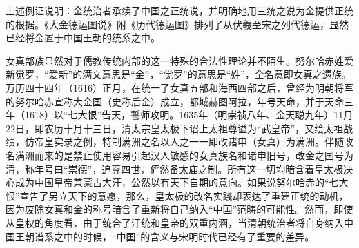 \documentclass[a4paper, 12pt, openright]{ctexbook}
\begin{document}
上述例证说明：金统治者承续了中国之正统说，并明确地用三统之说为金提供正统的根据。《大金德运图说》附《历代德运图》排列了从伏羲至宋之列代德运，显然已经将金置于中国王朝的统系之中。

女真部族显然对于儒教传统内部的这一特殊的合法性理论并不陌生。努尔哈赤姓爱新觉罗，“爱新”的满文意思是“金”，“觉罗”的意思是“姓”，全名意即女真之遗族。万历四十四年（1616）正月，在统一了女真五部和海西四部之后，曾经为明朝将军的努尔哈赤宣称大金国（史称后金）成立，都城赫图阿拉，年号天命，并于天命三年（1618）以“七大恨”告天，誓师攻明。1635年（明崇祯八年、金天聪九年）11月22日，即农历十月十三日，清太宗皇太极下诏上太祖尊谥为“武皇帝”，又绘太祖战绩，仿帝皇实录之例，特制满洲之名以人之一一即改诸申（女真）为满洲。伴随改名满洲而来的是禁止使用容易引起汉人敏感的女真族名和诸申旧号，改金之国号为清，称年号曰“崇德”，追尊四世，俨然备太庙之制。所有这一切均暗含着皇太极决心成为中国皇帝兼蒙古大汗，公然以有天下自期的意向。如果说努尔哈赤的“七大恨”宣告了另立天下的意愿，那么，皇太极的改名实践却表达了重建正统的动机，因为废除女真和金的称号暗含了重新将自己纳入“中国”范畴的可能性。然而，即使从皇权的角度看，由于统合了汗统和皇帝的双重内涵，当清朝统治者将自身纳入中国王朝谱系之中的时候，“中国”的含义与宋明时代已经有了重要的差异。
\end{document}
